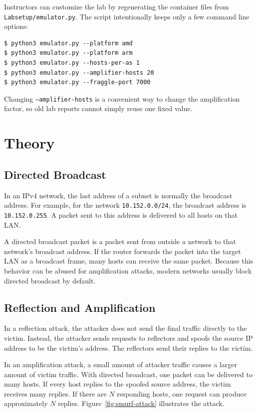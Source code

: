 Instructors can customize the lab by regenerating the container files from
\texttt{Labsetup/emulator.py}. The script intentionally keeps only a few command
line options:

\begin{lstlisting}
$ python3 emulator.py --platform amd
$ python3 emulator.py --platform arm
$ python3 emulator.py --hosts-per-as 1
$ python3 emulator.py --amplifier-hosts 20
$ python3 emulator.py --fraggle-port 7000
\end{lstlisting}

Changing \texttt{--amplifier-hosts} is a convenient way to change the
amplification factor, so old lab reports cannot simply reuse one fixed value.


\section{Theory}

\subsection{Directed Broadcast}

In an IPv4 network, the last address of a subnet is normally the broadcast
address. For example, for the network \texttt{10.152.0.0/24}, the broadcast
address is \texttt{10.152.0.255}. A packet sent to this address is delivered to
all hosts on that LAN.

A directed broadcast packet is a packet sent from outside a network to that
network's broadcast address. If the router forwards the packet into the target
LAN as a broadcast frame, many hosts can receive the same packet. Because this
behavior can be abused for amplification attacks, modern networks usually block
directed broadcast by default.


\subsection{Reflection and Amplification}

In a reflection attack, the attacker does not send the final traffic directly to
the victim. Instead, the attacker sends requests to reflectors and spoofs the
source IP address to be the victim's address. The reflectors send their replies
to the victim.

In an amplification attack, a small amount of attacker traffic causes a larger
amount of victim traffic. With directed broadcast, one packet can be delivered
to many hosts. If every host replies to the spoofed source address, the victim
receives many replies. If there are \(N\) responding hosts, one request can
produce approximately \(N\) replies. Figure~\ref{fig:smurf-attack} illustrates the attack.


